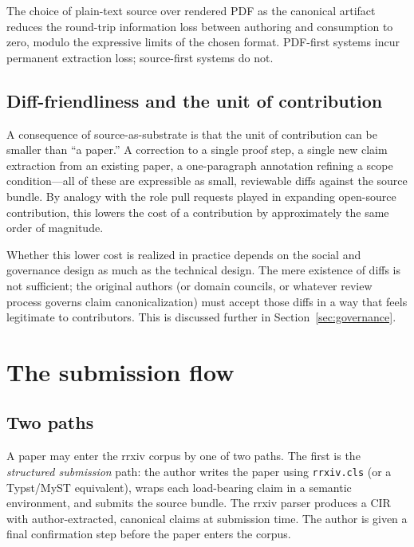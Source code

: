 \documentclass[11pt]{rrxiv}
\begin{document}
\begin{claim}[title=Source-of-truth invariance, type=theoretical, evidence=argument, labels={design-thesis}]
\label{claim:source-truth}
The choice of plain-text source over rendered PDF as the canonical artifact reduces the round-trip information loss between authoring and consumption to zero, modulo the expressive limits of the chosen format. PDF-first systems incur permanent extraction loss; source-first systems do not.
\end{claim}

\subsection{Diff-friendliness and the unit of contribution}

A consequence of source-as-substrate is that the unit of contribution can be smaller than ``a paper.'' A correction to a single proof step, a single new claim extraction from an existing paper, a one-paragraph annotation refining a scope condition---all of these are expressible as small, reviewable diffs against the source bundle. By analogy with the role pull requests played in expanding open-source contribution, this lowers the cost of a contribution by approximately the same order of magnitude.

Whether this lower cost is realized in practice depends on the social and governance design as much as the technical design. The mere existence of diffs is not sufficient; the original authors (or domain councils, or whatever review process governs claim canonicalization) must accept those diffs in a way that feels legitimate to contributors. This is discussed further in Section~\ref{sec:governance}.

\section{The submission flow}
\label{sec:submission}

\subsection{Two paths}

A paper may enter the rrxiv corpus by one of two paths. The first is the \emph{structured submission} path: the author writes the paper using \texttt{rrxiv.cls} (or a Typst/MyST equivalent), wraps each load-bearing claim in a semantic environment, and submits the source bundle. The rrxiv parser produces a CIR with author-extracted, canonical claims at submission time. The author is given a final confirmation step before the paper enters the corpus.
\end{document}

